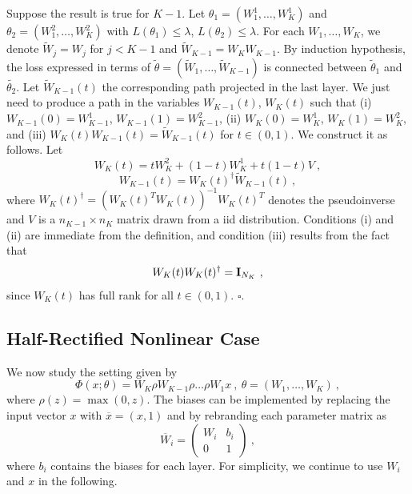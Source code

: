 \documentclass{article} %
\begin{document}
Suppose the result is true for $K-1$. Let $\theta_1 = (W_1^1, \dots, W^1_K)$ and 
 $\theta_2 = (W_1^2, \dots, W^2_K)$ with $L(\theta_1) \leq \lambda$, $L(\theta_2) \leq \lambda$.
For each $W_1, \dots, W_K$, we denote $\tilde{W}_j = W_j$ for $j < K-1$ and
$\tilde{W}_{K-1} = W_K W_{K-1}$. By induction hypothesis, the 
loss expressed in terms of $\tilde{\theta} = (\tilde{W}_1, \dots, \tilde{W}_{K-1})$ is connected 
between $\tilde{\theta}_1$ and $\tilde{\theta_2}$. Let $\tilde{W}_{K-1}(t)$ the corresponding 
path projected in the last layer. We just need to produce a path in the variables $W_{K-1}(t)$, $W_K(t)$ 
such that (i) $W_{K-1}(0) = W_{K-1}^1$, $W_{K-1}(1) = W_{K-1}^2$, 
(ii) $W_{K}(0) = W_{K}^1$, $W_{K}(1) = W_{K}^2$, and 
(iii) $W_{K}(t) W_{K-1}(t) = \tilde{W}_{K-1}(t)$ for $t \in (0,1)$. 
We construct it as follows. Let 
$$W_{K}(t) = t W_{K}^2 + (1-t) W_{K}^1 + t (1-t) V~,$$
$$W_{K-1}(t) = W_{K}(t)^\dagger \tilde{W}_{K-1}(t)  ~,$$
where $W_{K}(t)^\dagger = ( W_{K}(t)^T W_{K}(t))^{-1} W_{K}(t)^T$ denotes the pseudoinverse 
and $V$ is a $n_{K-1} \times n_{K}$ matrix drawn from a iid distribution. 
Conditions (i) and (ii) are immediate from the definition, and condition (iii) results from the fact that 
$$W_{K}(t) W_{K}(t)^\dagger  = {\bf I}_{N_K}~,$$
since $W_K(t)$ has full rank for all $t \in (0,1)$. 
$\square$.

\subsection{Half-Rectified Nonlinear Case}

We now study the setting given by 
\begin{equation}
\label{relucase}
\Phi(x;\theta) = W_K \rho W_{K-1} \rho \dots \rho W_1 x~,~\theta = (W_1, \dots, W_K)~,
\end{equation}
where $\rho(z) = \max(0 ,z)$. 
The biases can be implemented by replacing the input vector $x$ 
with $\overline{x}=(x, 1)$ and by rebranding each parameter matrix as 
$$\overline{W}_i = \left( 
\begin{array}{c|c}
W_i & b_i \\
\hline 
0 & 1 
\end{array}
\right)~,$$
where $b_i$ contains the biases for each layer.	
For simplicity, we continue to use $W_i$ and $x$ in the following.
\end{document}
